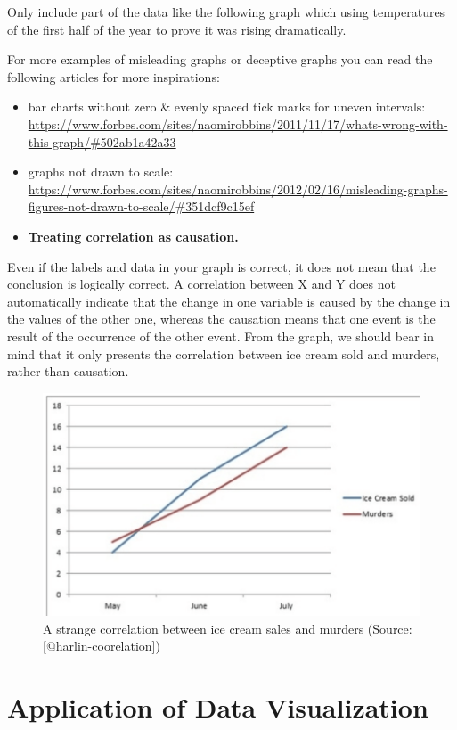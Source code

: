 \documentclass[]{book}
\theoremstyle{definition}
\theoremstyle{definition}
\theoremstyle{definition}
\theoremstyle{remark}
\begin{document}
Only include part of the data like the following graph which using
temperatures of the first half of the year to prove it was rising
dramatically.

For more examples of misleading graphs or deceptive graphs you can read
the following articles for more inspirations:

\begin{itemize}
\item
  bar charts without zero \& evenly spaced tick marks for uneven
  intervals:
  \url{https://www.forbes.com/sites/naomirobbins/2011/11/17/whats-wrong-with-this-graph/\#502ab1a42a33}
\item
  graphs not drawn to scale:
  \url{https://www.forbes.com/sites/naomirobbins/2012/02/16/misleading-graphs-figures-not-drawn-to-scale/\#351dcf9c15ef}
\item
  \textbf{Treating correlation as causation.}
\end{itemize}

Even if the labels and data in your graph is correct, it does not mean
that the conclusion is logically correct. A correlation between X and Y
does not automatically indicate that the change in one variable is
caused by the change in the values of the other one, whereas the
causation means that one event is the result of the occurrence of the
other event. From the graph, we should bear in mind that it only
presents the correlation between ice cream sold and murders, rather than
causation.

\begin{figure}
\includegraphics[width=0.7\linewidth]{images/harlin-ice-cream} \caption{A strange correlation between ice cream sales and murders (Source: [@harlin-coorelation])}\label{fig:harlin-ice-cream}
\end{figure}

\section{Application of Data
Visualization}\label{application-of-data-visualization}
\end{document}
